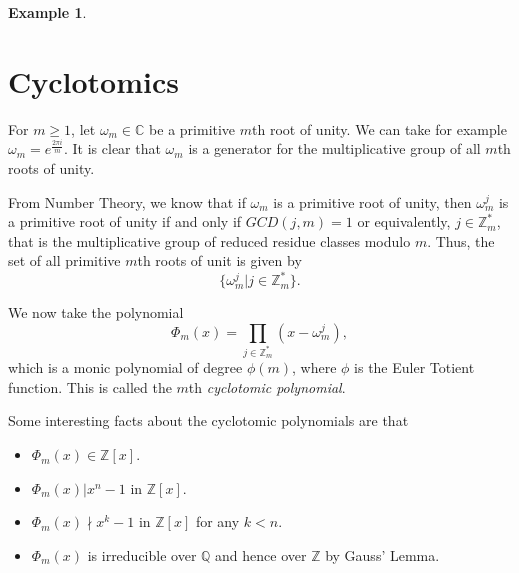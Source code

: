 \documentclass[12pt]{article}
\theoremstyle{plain}
\newtheorem{example}{Example}
\theoremstyle{definition}
\theoremstyle{remark}
\begin{document}
\begin{example}
\begin{enumerate}

\end{enumerate}
\end{example}


\section{Cyclotomics}
For $m\geq 1$, let $\omega_m \in \mathbb{C}$ be a primitive $m$th root of unity. We can take for example $\omega_m = e^{\frac{2\pi i}{m}}$. It is clear that $\omega_m$ is a generator for the multiplicative group of all $m$th roots of unity.

From Number Theory, we know that if $\omega_m$ is a primitive root of unity, then $\omega_m^j$ is a primitive root of unity if and only if $GCD(j,m)=1$ or equivalently, $j\in \mathbb{Z}^*_m$, that is the multiplicative group of reduced residue classes modulo $m$. Thus, the set of all primitive $m$th roots of unit is given by
$$\{\omega_m^j| j \in \mathbb{Z}^*_m\}. $$

We now take the polynomial
$$\Phi_m(x) = \prod_{j\in \mathbb{Z}^*_m} (x-\omega_m^j),$$
which is a monic polynomial of degree $\phi(m)$, where $\phi$ is the Euler Totient function. This is called the $m$th {\it cyclotomic polynomial}.

Some interesting facts about the cyclotomic polynomials are that
\begin{itemize}
\item $\Phi_m(x) \in \mathbb{Z}[x]$.
\item $\Phi_m(x)|x^n-1$ in $\mathbb{Z}[x]$.
\item $\Phi_m(x)\nmid x^k-1$ in $\mathbb{Z}[x]$ for any $k<n$.
\item $\Phi_m(x)$ is irreducible over $\mathbb{Q}$ and hence over $\mathbb{Z}$ by Gauss' Lemma.
\end{itemize}
\end{document}
